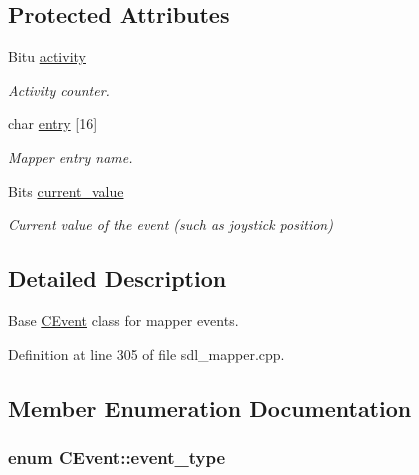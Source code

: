 \subsection*{Protected Attributes}
\begin{DoxyCompactItemize}
\item 
\hypertarget{classCEvent_a487786e4e537594bf963e96aecae85cd}{Bitu \hyperlink{classCEvent_a487786e4e537594bf963e96aecae85cd}{activity}}\label{classCEvent_a487786e4e537594bf963e96aecae85cd}

\begin{DoxyCompactList}\small\item\em Activity counter. \end{DoxyCompactList}\item 
\hypertarget{classCEvent_a20cca21cb3c606f3161a2757c1ba466d}{char \hyperlink{classCEvent_a20cca21cb3c606f3161a2757c1ba466d}{entry} \mbox{[}16\mbox{]}}\label{classCEvent_a20cca21cb3c606f3161a2757c1ba466d}

\begin{DoxyCompactList}\small\item\em Mapper entry name. \end{DoxyCompactList}\item 
\hypertarget{classCEvent_a7bbacdb8e3c5ee41ce13af19dc21db2d}{Bits \hyperlink{classCEvent_a7bbacdb8e3c5ee41ce13af19dc21db2d}{current\-\_\-value}}\label{classCEvent_a7bbacdb8e3c5ee41ce13af19dc21db2d}

\begin{DoxyCompactList}\small\item\em Current value of the event (such as joystick position) \end{DoxyCompactList}\end{DoxyCompactItemize}


\subsection{Detailed Description}
Base \hyperlink{classCEvent}{C\-Event} class for mapper events. 

Definition at line 305 of file sdl\-\_\-mapper.\-cpp.



\subsection{Member Enumeration Documentation}
\hypertarget{classCEvent_a93a65775636793dfcabe38d14739c2bd}{
\subsubsection[{event\-\_\-type}]{\setlength{\rightskip}{0pt plus 5cm}enum {\bf C\-Event\-::event\-\_\-type}}}\label{classCEvent_a93a65775636793dfcabe38d14739c2bd}


